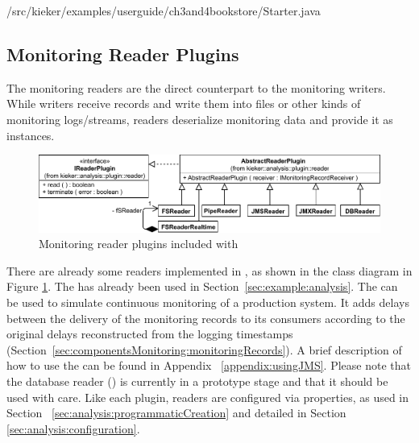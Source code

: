 \medskip

\setJavaCodeListing
%
{\customComponentsBookstoreApplicationDir/src/kieker/examples/userguide/ch3and4bookstore/Starter.java}

\enlargethispage{0.5cm}

\subsection{Monitoring Reader Plugins}

The monitoring readers are the direct counterpart to the monitoring %
writers. While writers receive records and write them into files or other kinds %
of monitoring logs/streams, readers deserialize monitoring data and provide it as %
 instances. 

\begin{figure}\centering
\includegraphics[scale=0.7]{images/kieker_readerimplsuserguide-modified}
\caption{Monitoring reader plugins included with \Kieker{}}
\label{Figure:ReaderHierarchy}
\end{figure}


% 
% 


\noindent There are already some readers implemented in \Kieker,  as shown in the %
class diagram in Figure \ref{Figure:ReaderHierarchy}. %
The  has already been used in Section~\ref{sec:example:analysis}. %
The  can be used to simulate continuous monitoring of a %
production system. It adds delays between the delivery of the monitoring records %
to its consumers according to the original delays reconstructed from the logging %
timestamps (Section~\ref{sec:componentsMonitoring:monitoringRecords}).
A brief description of how to use the  can be found in Appendix~%
\ref{appendix:usingJMS}. Please note that the database reader () %
is currently in a prototype stage and that it should be used with care. %
Like each plugin, readers are configured via properties, as used in Section~%
\ref{sec:analysis:programmaticCreation} and detailed in Section~%
\ref{sec:analysis:configuration}. 

